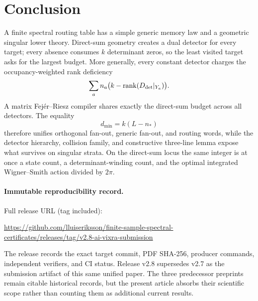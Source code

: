 \documentclass[11pt]{article}
\theoremstyle{definition}\newtheorem{definition}[theorem]{Definition}\newtheorem{example}[theorem]{Example}
\theoremstyle{remark}\newtheorem{remark}[theorem]{Remark}\newtheorem{limitation}[theorem]{Limitation}
\newcommand{\rank}{\operatorname{rank}}
\begin{document}
\section{Conclusion}

A finite spectral routing table has a simple generic memory law and a
geometric singular lower theory.  Direct-sum geometry creates a dual
detector for every target; every absence consumes $k$ determinant zeros, so
the least visited target asks for the largest budget.  More generally, every
constant detector charges the occupancy-weighted rank deficiency
\[
                 \sum_a n_a\bigl(k-\rank(D_{\rm det}|_{Y_a})\bigr).
\]
A matrix Fej\'er--Riesz compiler shares exactly the direct-sum budget across
all detectors.  The equality
\[
                         d_{\min}=k(L-n_*)
\]
therefore unifies orthogonal fan-out, generic fan-out, and routing words,
while the detector hierarchy, collision family, and constructive three-line
lemma expose what survives on singular strata.  On the direct-sum locus the
same integer is at once a state count, a determinant-winding count, and the
optimal integrated Wigner--Smith action divided by $2\pi$.

\paragraph{Immutable reproducibility record.}
Full release URL (tag included):
\begin{center}\small
\url{https://github.com/lluiseriksson/finite-sample-spectral-certificates/releases/tag/v2.8-ai-vixra-submission}
\end{center}
The release records the exact target commit, PDF SHA-256, producer commands,
independent verifiers, and CI status.  Release v2.8 supersedes v2.7 as the
submission artifact of this same unified paper.  The three predecessor
preprints remain citable historical records, but the present article absorbs
their scientific scope rather than counting them as additional current
results.



\end{document}
